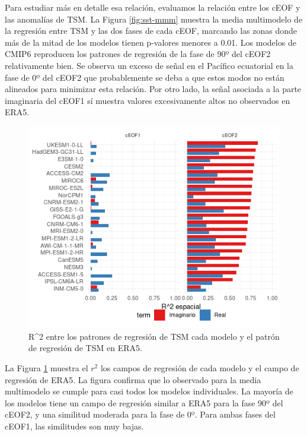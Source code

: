 \documentclass[12pt,oneside]{reedthesis}
\begin{document}
Para estudiar más en detalle esa relación, evaluamos la relación entre los cEOF y las anomalías de TSM.
La Figura \ref{fig:sst-mmm} muestra la media multimodelo de la regresión entre TSM y las dos fases de cada cEOF, marcando las zonas donde más de la mitad de los modelos tienen p-valores menores a 0.01.
Los modelos de CMIP6 reproducen los patrones de regresión de la fase de 90º del cEOF2 relativamente bien.
Se observa un exceso de señal en el Pacífico ecuatorial en la fase de 0º del cEOF2 que probablemente se deba a que estos modos no están alineados para minimizar esta relación.
Por otro lado, la señal asociada a la parte imaginaria del cEOF1 sí muestra valores excesivamente altos no observados en ERA5.



\begin{figure}
\includegraphics{figures/50-cmip6/cor-sst-regr-1} \caption{R\^{}2 entre los patrones de regresión de TSM cada modelo y el patrón de regresión de TSM en ERA5.}\label{fig:cor-sst-regr}
\end{figure}

La Figura \ref{fig:cor-sst-regr} muestra el \(r^2\) los campos de regresión de cada modelo y el campo de regresión de ERA5.
La figura confirma que lo observado para la media multimodelo se cumple para casi todos los modelos individuales.
La mayoría de los modelos tiene un campo de regresión similar a ERA5 para la fase 90º del cEOF2, y una similitud moderada para la fase de 0º.
Para ambas fases del cEOF1, las similitudes son muy bajas.
\end{document}
